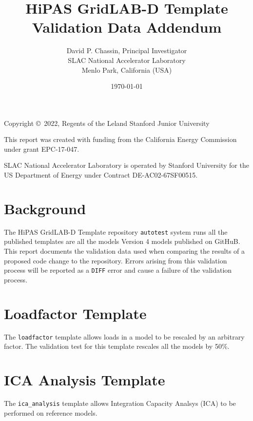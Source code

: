\documentclass{article}
\title
{
	HiPAS GridLAB-D Template Validation Data Addendum
}
\author
{
	David P. Chassin, Principal Investigator
\\
	SLAC National Accelerator Laboratory
\\
	Menlo Park, California (USA) 
}
\date { \today }
\def\code#1{\texttt{#1}}
\begin{document}
\maketitle

\center 
{
	Copyright \copyright\ 2022, Regents of the Leland Stanford Junior University

\vspace{1cm}

	This report was created with funding from the California Energy Commission under grant EPC-17-047.

\vspace{1cm}

	SLAC National Accelerator Laboratory is operated by Stanford University for the US Department of Energy
	under Contract DE-AC02-67SF00515.
}

\newpage

\tableofcontents

\newpage

\listoftables

\newpage

\section{Background}

The HiPAS GridLAB-D Template repository \code{autotest} system runs all the published templates are all the models Version 4 models published on GitHuB. This report documents the validation data used when comparing the results of a proposed code change to the repository. Errors arising from this validation process will be reported as a \code{DIFF} error and cause a failure of the validation process.

\section{Loadfactor Template}

The \code{loadfactor} template allows loads in a model to be rescaled by an arbitrary factor. The validation test for this template rescales all the models by 50\%.



\section{ICA Analysis Template}

The \code{ica\_analysis} template allows Integration Capacity Analsys (ICA) to be performed on reference models. 



\end{document}
